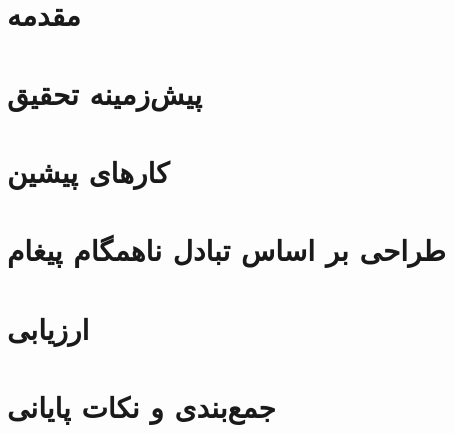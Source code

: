 \documentclass[oneside, a4paper,11pt]{book}
\numberwithin{equation}{chapter}
\numberwithin{table}{chapter}
\numberwithin{figure}{chapter}
\numberwithin{equation}{chapter}
\begin{document}
\setcounter{page}{1}
\setcounter{secnumdepth}{3}
\chapter{مقدمه}
\label{chapter:Introduction}
\thispagestyle{plain}

\chapter{پیش‌زمینه تحقیق}
\label{chapter:Preliminaries}
\thispagestyle{plain}

\chapter{کارهای پیشین}
\label{chapter:RelatedWork}
\thispagestyle{plain}

\chapter{طراحی بر اساس تبادل ناهمگام پیغام}
\label{chapter:proposedFramework}
\thispagestyle{plain}

\chapter{ارزیابی}
\label{chapter:evaluation}
\thispagestyle{plain}

\chapter{جمع‌بندی و نکات پایانی}
\label{chapter:Conclusion}
\thispagestyle{plain}


%
\newpage

\linespread{1.2}

\small{

\clearpage
{}
{}

}

\newpage
\begin{multicols}{2}
\def\glossaryname{واژه‌نامه‌ی فارسی به انگلیسی}
\printglossary
{}
\end{multicols}
\end{document}
